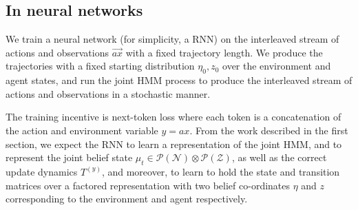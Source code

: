 \documentclass[11pt]{article}
\begin{document}

\subsection*{In neural networks}

We train a neural network (for simplicity, a RNN) on the interleaved stream of actions and observations $\vec{ax}$ with a fixed trajectory length. We produce the trajectories with a fixed starting distribution $\eta_0, z_0$ over the environment and agent states, and run the joint HMM process to produce the interleaved stream of actions and observations in a stochastic manner.

The training incentive is next-token loss where each token is a concatenation of the action and environment variable $y = ax$. From the work described in the first section, we expect the RNN to learn a representation of the joint HMM, and to represent the joint belief state $\mu_t \in \mathcal P(\mathcal N)\otimes \mathcal P(\mathcal Z)$, as well as the correct update dynamics $T^{(y)}$, and moreover, to learn to hold the state and transition matrices over a factored representation with two belief co-ordinates $\eta$ and $z$ corresponding to the environment and agent respectively. 
\end{document}
